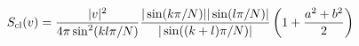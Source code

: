 \begin{equation}
S_{\rm cl}(v)= {\vert v\vert^2  \over 4\pi \sin^2(kl\pi/N)}
{\vert \sin(k\pi/N)\vert \vert \sin(l\pi/N)\vert \over
\vert \sin((k+l)\pi/N)\vert}  \left(1+ {a^2 +b^2 \over 2}\right)
\end{equation}

